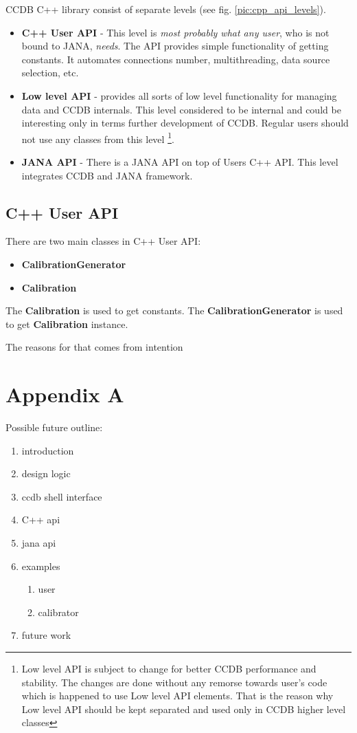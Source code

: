 \documentclass{article}
\begin{document}
CCDB C++ library consist of separate levels (see fig. \ref{pic:cpp_api_levels}).
\begin{itemize}
\item \textbf{C++ User API} - This level is \textit{most probably what any user}, 
      who is not bound to JANA, \textit{needs}. The API provides simple 
      functionality of getting  constants. It automates connections number, 
      multithreading, data source selection, etc.
      
\item \textbf{Low level API} - provides all sorts of low level functionality for 
       managing data and CCDB internals. This level considered to be internal 
       and could be interesting only in terms further development of CCDB. 
       Regular users should not use any classes from this level       
       \footnote{Low level API is subject to change for better CCDB performance 
                 and stability. The changes are done without any 
                 remorse towards user's code which is happened to use Low 
                 level API elements. That is the reason why Low level API 
                 should be kept separated and used only in CCDB higher level
                 classes}. 
       
\item \textbf{JANA API} - There is a JANA API on top of Users C++ API. This 
      level integrates CCDB and JANA framework. 
\end{itemize}


\subsection{C++ User API}

There are two main classes in C++ User API:

\begin{itemize}
  \item \textbf{CalibrationGenerator}
  \item \textbf{Calibration}
\end{itemize}
The \textbf{Calibration} is used to get constants. 
The \textbf{CalibrationGenerator} is used to get \textbf{Calibration} instance. 




The reasons for that comes from intention 


\section{Appendix A}

Possible future outline:

\begin{enumerate}
\item introduction
\item design logic
\item ccdb shell interface
\item C++ api
\item jana api
\item examples
  \begin{enumerate}
  \item user
  \item calibrator
  \end{enumerate}
\item future work
\end{enumerate}
\end{document}
